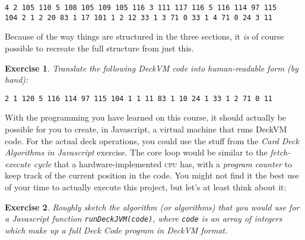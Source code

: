 \documentclass[a4paper,twoside]{tufte-handout}
\newtheorem{exercise}{Exercise}
\begin{document}
\begin{lstlisting}
4 2 105 110 5 108 105 109 105 116 3 111 117 116 5 116 114 97 115
104 2 1 2 20 83 1 17 101 1 2 12 33 1 3 71 0 33 1 4 71 0 24 3 11
\end{lstlisting}

Because of the way things are structured in the three sections, it
\emph{is} of course possible to recreate the full structure from just
this.

\begin{exercise}
  Translate the following DeckVM code into human-readable form (by
  hand):
\begin{lstlisting}
2 1 120 5 116 114 97 115 104 1 1 11 83 1 10 24 1 33 1 2 71 0 11
\end{lstlisting}
\end{exercise}

With the programming you have learned on this course, it should
actually be
possible for you to create, in Javascript, a virtual
machine that runs DeckVM code.
For the actual deck operations, you could use the stuff from the
\emph{Card Deck Algorithms in Javascript} exercise. The core loop
would be similar to the \emph{fetch-execute cycle} that a
hardware-implemented \textsc{cpu} has, with a \emph{program counter}
to keep track of the current position in the code. You might not find
it the best use of your time to actually execute this project, but
let's at least think about it:

\begin{exercise}
  Roughly sketch the algorithm (or algorithms) that you would use for
  a Javascript function \verb'runDeckJVM(code)', where \verb'code' is
  an array of integers which make up a full Deck Code program in
  DeckVM format.
\end{exercise}
\end{document}
